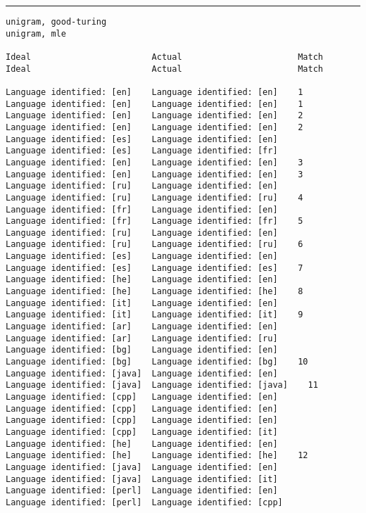 \tiny
\hrule\vskip4pt
\begin{verbatim}
unigram, good-turing                                              unigram, mle

Ideal                        Actual                       Match   Ideal                        Actual                       Match

Language identified: [en]    Language identified: [en]    1       Language identified: [en]    Language identified: [en]    1
Language identified: [en]    Language identified: [en]    2       Language identified: [en]    Language identified: [en]    2
Language identified: [es]    Language identified: [en]            Language identified: [es]    Language identified: [fr]
Language identified: [en]    Language identified: [en]    3       Language identified: [en]    Language identified: [en]    3
Language identified: [ru]    Language identified: [en]            Language identified: [ru]    Language identified: [ru]    4
Language identified: [fr]    Language identified: [en]            Language identified: [fr]    Language identified: [fr]    5
Language identified: [ru]    Language identified: [en]            Language identified: [ru]    Language identified: [ru]    6
Language identified: [es]    Language identified: [en]            Language identified: [es]    Language identified: [es]    7
Language identified: [he]    Language identified: [en]            Language identified: [he]    Language identified: [he]    8
Language identified: [it]    Language identified: [en]            Language identified: [it]    Language identified: [it]    9
Language identified: [ar]    Language identified: [en]            Language identified: [ar]    Language identified: [ru]
Language identified: [bg]    Language identified: [en]            Language identified: [bg]    Language identified: [bg]    10
Language identified: [java]  Language identified: [en]            Language identified: [java]  Language identified: [java]    11
Language identified: [cpp]   Language identified: [en]            Language identified: [cpp]   Language identified: [en]
Language identified: [cpp]   Language identified: [en]            Language identified: [cpp]   Language identified: [it]
Language identified: [he]    Language identified: [en]            Language identified: [he]    Language identified: [he]    12
Language identified: [java]  Language identified: [en]            Language identified: [java]  Language identified: [it]
Language identified: [perl]  Language identified: [en]            Language identified: [perl]  Language identified: [cpp]

\end{verbatim}
